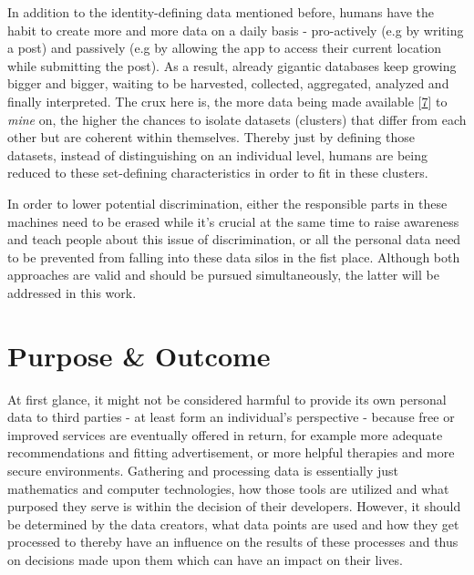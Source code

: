 \documentclass[12pt,english,a4paper,titlepage,cleardoublepage=empty,dottedtoc]{report}
\begin{document}
In addition to the identity-defining data mentioned before, humans have
the habit to create more and more data on a daily basis - pro-actively
(e.g by writing a post) and passively (e.g by allowing the app to access
their current location while submitting the post). As a result, already
gigantic databases keep growing bigger and bigger, waiting to be
harvested, collected, aggregated, analyzed and finally interpreted. The
crux here is, the more data being made available
{[}\protect\hyperlink{ref-video_2015_big-data-and-deep-learning_discrimination}{7}{]}
to \emph{mine} on, the higher the chances to isolate datasets (clusters)
that differ from each other but are coherent within themselves. Thereby
just by defining those datasets, instead of distinguishing on an
individual level, humans are being reduced to these set-defining
characteristics in order to fit in these clusters.

In order to lower potential discrimination, either the responsible parts
in these machines need to be erased while it's crucial at the same time
to raise awareness and teach people about this issue of discrimination,
or all the personal data need to be prevented from falling into these
data silos in the fist place. Although both approaches are valid and
should be pursued simultaneously, the latter will be addressed in this
work.

\section{Purpose \& Outcome}\label{purpose-outcome}

At first glance, it might not be considered harmful to provide its own
personal data to third parties - at least form an individual's
perspective - because free or improved services are eventually offered
in return, for example more adequate recommendations and fitting
advertisement, or more helpful therapies and more secure environments.
Gathering and processing data is essentially just mathematics and
computer technologies, how those tools are utilized and what purposed
they serve is within the decision of their developers. However, it
should be determined by the data creators, what data points are used and
how they get processed to thereby have an influence on the results of
these processes and thus on decisions made upon them which can have an
impact on their lives.
\end{document}

